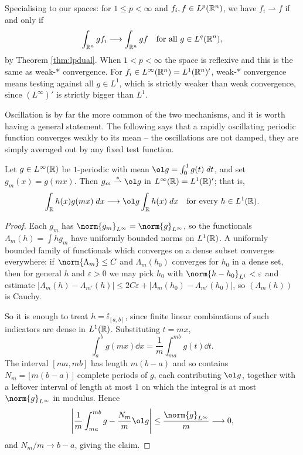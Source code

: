 \documentclass[a4paper]{scrartcl}
\newcommand{\weakto}{\rightharpoonup}
\newcommand{\wsto}{\overset{*}{\rightharpoonup}}
\begin{document}
\begin{example}
	Specialising to our spaces: for $1 \le p < \infty$ and $f_i, f \in L^p(\mathbb{R}^n)$, we have $f_i \weakto f$ if and only if
	$$\int_{\mathbb{R}^n} g f_i \longrightarrow \int_{\mathbb{R}^n} gf \quad \text{for all } g \in L^q(\mathbb{R}^n),$$
	by Theorem \ref{thm:lpdual}. When $1 < p < \infty$ the space is reflexive and this is the same as weak-$*$ convergence. For $f_i \in L^\infty(\mathbb{R}^n) = L^1(\mathbb{R}^n)'$, weak-$*$ convergence means testing against all $g \in L^1$, which is strictly weaker than weak convergence, since $(L^\infty)'$ is strictly bigger than $L^1$.
\end{example}

Oscillation is by far the more common of the two mechanisms, and it is worth having a general statement. The following says that a rapidly oscillating periodic function converges weakly to its mean -- the oscillations are not damped, they are simply averaged out by any fixed test function.

\begin{proposition}\label{prop:oscillation}
	Let $g \in L^\infty(\mathbb{R})$ be $1$-periodic with mean $\ol g = \int_0^1 g(t)\dd t$, and set $g_m(x) = g(mx)$. Then $g_m \wsto \ol g$ in $L^\infty(\mathbb{R}) = L^1(\mathbb{R})'$; that is,
	$$\int_\R h(x)g(mx)\dd x \longrightarrow \ol g \int_\R h(x) \dd x \quad \text{for every } h \in L^1(\R).$$
\end{proposition}

\begin{proof}
	Each $g_m$ has $\norm{g_m}_{L^\infty}=\norm{g}_{L^\infty}$, so the functionals $\Lambda_m(h)=\int hg_m$ have uniformly bounded norms on $L^1(\mathbb{R})$. A uniformly bounded family of functionals which converges on a dense subset converges everywhere: if $\norm{\Lambda_m}\le C$ and $\Lambda_m(h_0)$ converges for $h_0$ in a dense set, then for general $h$ and $\varepsilon>0$ we may pick $h_0$ with $\norm{h-h_0}_{L^1}<\varepsilon$ and estimate $|\Lambda_m(h)-\Lambda_{m'}(h)|\le 2C\varepsilon+|\Lambda_m(h_0)-\Lambda_{m'}(h_0)|$, so $(\Lambda_m(h))$ is Cauchy.

	So it is enough to treat $h = \ii_{[a,b]}$, since finite linear combinations of such indicators are dense in $L^1(\mathbb{R})$. Substituting $t = mx$,
	$$\int_a^b g(mx)\dd x = \frac 1m \int_{ma}^{mb}g(t)\dd t.$$
	The interval $[ma,mb]$ has length $m(b-a)$ and so contains $N_m = \lfloor m(b-a)\rfloor$ complete periods of $g$, each contributing $\ol g$, together with a leftover interval of length at most $1$ on which the integral is at most $\norm{g}_{L^\infty}$ in modulus. Hence
	$$\left| \frac 1m\int_{ma}^{mb}g - \frac{N_m}{m}\ol g\right| \le \frac{\norm{g}_{L^\infty}}{m} \longrightarrow 0,$$
	and $N_m/m \to b-a$, giving the claim.
\end{proof}
\end{document}

